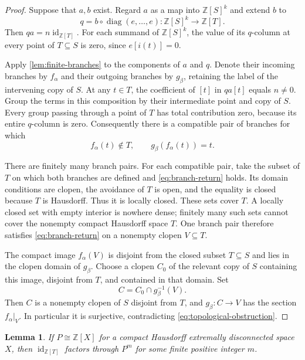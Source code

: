 \documentclass[11pt]{article}
\newtheorem{lemma}[theorem]{Lemma}
\theoremstyle{definition}
\theoremstyle{remark}
\newcommand{\Z}{\mathbb Z}
\newcommand{\id}{\operatorname{id}}
\begin{document}
\begin{proof}
Suppose that $a,b$ exist. Regard $a$ as a map into $\Z[S]^k$ and extend
$b$ to
\[
 q=b\circ\operatorname{diag}(e,\ldots,e):
       \Z[S]^k\longrightarrow\Z[T].
\]
Then $qa=n\id_{\Z[T]}$. For each summand of $\Z[S]^k$, the value of
its $q$-column at every point of $T\subseteq S$ is zero, since
$e[i(t)]=0$.

Apply \cref{lem:finite-branches} to the components of $a$ and $q$.
Denote their incoming branches by $f_\alpha$ and their outgoing
branches by $g_\beta$, retaining the label of the intervening copy
of $S$. At any $t\in T$, the coefficient of $[t]$ in $qa[t]$ equals
$n\ne0$. Group the terms in this composition by their intermediate
point and copy of $S$. Every group passing through a point of $T$
has total contribution zero, because its entire $q$-column is zero.
Consequently there is a compatible pair of branches for which
\begin{equation}
\label{eq:branch-return}
 f_\alpha(t)\notin T,
 \qquad g_\beta(f_\alpha(t))=t.
\end{equation}

There are finitely many branch pairs. For each compatible pair, take
the subset of $T$ on which both branches are defined and
\eqref{eq:branch-return} holds. Its domain conditions are clopen,
the avoidance of $T$ is open, and the equality is closed because
$T$ is Hausdorff. Thus it is locally closed. These sets cover $T$.
A locally closed set with empty interior is nowhere dense; finitely
many such sets cannot cover the nonempty compact Hausdorff space $T$.
One branch pair therefore satisfies \eqref{eq:branch-return} on a
nonempty clopen $V\subseteq T$.

The compact image $f_\alpha(V)$ is disjoint from the closed subset
$T\subseteq S$ and lies in the clopen domain of $g_\beta$. Choose a
clopen $C_0$ of the relevant copy of $S$ containing this image,
disjoint from $T$, and contained in that domain. Set
\[
 C=C_0\cap g_\beta^{-1}(V).
\]
Then $C$ is a nonempty clopen of $S$ disjoint from $T$, and
$g_\beta:C\to V$ has the section $f_\alpha|_V$. In particular it is
surjective, contradicting \eqref{eq:topological-obstruction}.
\end{proof}

\begin{lemma}
\label{lem:freeness-factorization}
If $P\cong\Z[X]$ for a compact Hausdorff extremally disconnected
space $X$, then $\id_{\Z[T]}$ factors through $P^m$ for some finite
positive integer $m$.
\end{lemma}
\end{document}
